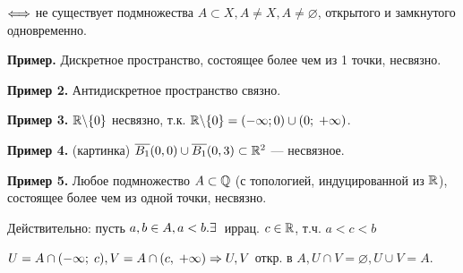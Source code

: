 \documentclass[../../main.tex]{subfiles}
\begin{document}
$\Longleftrightarrow$ не существует подмножества $A \subset X, A \neq X, A \neq \varnothing$, открытого и замкнутого одновременно.

\textbf{Пример.} Дискретное пространство, состоящее более чем из 1 точки, несвязно.

\textbf{Пример 2.} Антидискретное пространство связно.

\textbf{Пример 3.} $\mathbb{R} \backslash \{0\}$ несвязно, т.к. $\mathbb{R} \backslash\{0\} = (-\infty; 0) \cup (0;\; +\infty)$.

\textbf{Пример 4.} (картинка) $\overline{B_1}(0,0)\cup \overline{B_1}(0, 3) \subset \mathbb{R}^2$ — несвязное. 

\textbf{Пример 5.} Любое подмножество $A \subset \mathbb{Q}$ (с топологией, индуцированной из $\mathbb{R}$), состоящее более чем из одной точки, несвязно.

Действительно: пусть $a, b \in A, a < b. \exists\: $ иррац. $c \in \mathbb{R}$, т.ч. $a < c < b$

$U = A \cap (-\infty;\; c), V = A \cap (c,\; +\infty) \Rightarrow U, V$ откр. в $A, U \cap V = \varnothing, U \cup V = A$. 
\end{document}
